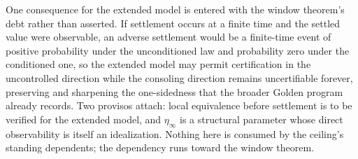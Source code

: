 \begin{remark}
One consequence for the extended model is entered with the window
theorem's debt rather than asserted. If settlement occurs at a
finite time and the settled value were observable, an adverse
settlement would be a finite-time event of positive probability
under the unconditioned law and probability zero under the
conditioned one, so the extended model may permit certification in
the uncontrolled direction while the consoling direction remains
uncertifiable forever, preserving and sharpening the one-sidedness
that the broader Golden program already records. Two provisos
attach: local equivalence before settlement is to be verified for
the extended model, and $\eta_\infty$ is a structural parameter
whose direct observability is itself an idealization. Nothing here
is consumed by the ceiling's standing dependents; the dependency
runs toward the window theorem.
\end{remark}

